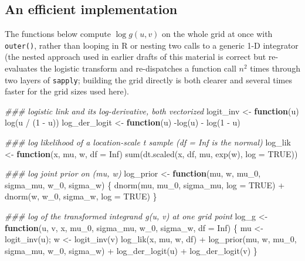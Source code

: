 \documentclass[
  letterpaper,
  DIV=11,
  numbers=noendperiod]{scrreprt}
\newenvironment{Shaded}{\begin{snugshade}}{\end{snugshade}}
\newcommand{\AttributeTok}[1]{\textcolor[rgb]{0.40,0.45,0.13}{#1}}
\newcommand{\ConstantTok}[1]{\textcolor[rgb]{0.56,0.35,0.01}{#1}}
\newcommand{\ControlFlowTok}[1]{\textcolor[rgb]{0.00,0.23,0.31}{\textbf{#1}}}
\newcommand{\DecValTok}[1]{\textcolor[rgb]{0.68,0.00,0.00}{#1}}
\newcommand{\DocumentationTok}[1]{\textcolor[rgb]{0.37,0.37,0.37}{\textit{#1}}}
\newcommand{\FunctionTok}[1]{\textcolor[rgb]{0.28,0.35,0.67}{#1}}
\newcommand{\NormalTok}[1]{\textcolor[rgb]{0.00,0.23,0.31}{#1}}
\newcommand{\OtherTok}[1]{\textcolor[rgb]{0.00,0.23,0.31}{#1}}
\newcommand{\SpecialCharTok}[1]{\textcolor[rgb]{0.37,0.37,0.37}{#1}}
\begin{document}
\subsection{An efficient
implementation}\label{an-efficient-implementation}

The functions below compute \(\log g(u,v)\) on the whole grid at once
with \texttt{outer()}, rather than looping in R or nesting two calls to
a generic 1-D integrator (the nested approach used in earlier drafts of
this material is correct but re-evaluates the logistic transform and
re-dispatches a function call \(n^2\) times through two layers of
\texttt{sapply}; building the grid directly is both clearer and several
times faster for the grid sizes used here).

\begin{Shaded}
\begin{Highlighting}[]
\DocumentationTok{\#\#\# logistic link and its log{-}derivative, both vectorized}
\NormalTok{logit\_inv     }\OtherTok{\textless{}{-}} \ControlFlowTok{function}\NormalTok{(u) }\FunctionTok{log}\NormalTok{(u }\SpecialCharTok{/}\NormalTok{ (}\DecValTok{1} \SpecialCharTok{{-}}\NormalTok{ u))}
\NormalTok{log\_der\_logit }\OtherTok{\textless{}{-}} \ControlFlowTok{function}\NormalTok{(u) }\SpecialCharTok{{-}}\FunctionTok{log}\NormalTok{(u) }\SpecialCharTok{{-}} \FunctionTok{log}\NormalTok{(}\DecValTok{1} \SpecialCharTok{{-}}\NormalTok{ u)}

\DocumentationTok{\#\#\# log likelihood of a location{-}scale t sample (df = Inf is the normal)}
\NormalTok{log\_lik }\OtherTok{\textless{}{-}} \ControlFlowTok{function}\NormalTok{(x, mu, w, }\AttributeTok{df =} \ConstantTok{Inf}\NormalTok{) }\FunctionTok{sum}\NormalTok{(}\FunctionTok{dt.scaled}\NormalTok{(x, df, mu, }\FunctionTok{exp}\NormalTok{(w), }\AttributeTok{log =} \ConstantTok{TRUE}\NormalTok{))}

\DocumentationTok{\#\#\# log joint prior on (mu, w)}
\NormalTok{log\_prior }\OtherTok{\textless{}{-}} \ControlFlowTok{function}\NormalTok{(mu, w, mu\_0, sigma\_mu, w\_0, sigma\_w) \{}
    \FunctionTok{dnorm}\NormalTok{(mu, mu\_0, sigma\_mu, }\AttributeTok{log =} \ConstantTok{TRUE}\NormalTok{) }\SpecialCharTok{+} \FunctionTok{dnorm}\NormalTok{(w, w\_0, sigma\_w, }\AttributeTok{log =} \ConstantTok{TRUE}\NormalTok{)}
\NormalTok{\}}

\DocumentationTok{\#\#\# log of the transformed integrand g(u, v) at one grid point}
\NormalTok{log\_g }\OtherTok{\textless{}{-}} \ControlFlowTok{function}\NormalTok{(u, v, x, mu\_0, sigma\_mu, w\_0, sigma\_w, }\AttributeTok{df =} \ConstantTok{Inf}\NormalTok{) \{}
\NormalTok{    mu }\OtherTok{\textless{}{-}} \FunctionTok{logit\_inv}\NormalTok{(u); w }\OtherTok{\textless{}{-}} \FunctionTok{logit\_inv}\NormalTok{(v)}
    \FunctionTok{log\_lik}\NormalTok{(x, mu, w, df) }\SpecialCharTok{+} \FunctionTok{log\_prior}\NormalTok{(mu, w, mu\_0, sigma\_mu, w\_0, sigma\_w) }\SpecialCharTok{+}
        \FunctionTok{log\_der\_logit}\NormalTok{(u) }\SpecialCharTok{+} \FunctionTok{log\_der\_logit}\NormalTok{(v)}
\NormalTok{\}}


\end{Highlighting}
\end{Shaded}
\end{document}
